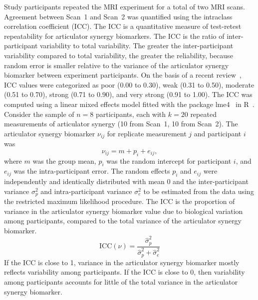 \documentclass[preprint]{JASAnew}\usepackage[]{graphicx}\usepackage[]{color}
\begin{document}
Study participants repeated the MRI experiment for a total of two MRI scans. Agreement between Scan~\num{1} and Scan~\num{2} was quantified using the intraclass correlation coefficient (ICC). The ICC is a quantitative measure of test-retest repeatability for articulator synergy biomarkers. 
The ICC is the ratio of inter-participant variability to total variability. The greater the inter-participant variability compared to total variability, the greater the reliability, because random error is smaller relative to the variance of the articulator synergy biomarker between experiment participants. 
On the basis of a recent review~\citep{lebreton2007answers}, ICC values were categorized as poor (\num{0.00} to \num{0.30}), weak (\num{0.31} to \num{0.50}), moderate (\num{0.51} to \num{0.70}), strong (\num{0.71} to \num{0.90}), and very strong (\num{0.91} to \num{1.00}).
%
The ICC was computed using a linear mixed effects model fitted with the package lme4~\citep{bates2015fitting} in R~\citep{r2017language}. Consider the sample of $n=8$ participants, each with $k=20$ repeated measurements of articulator synergy (\num{10} from Scan~\num{1}, \num{10} from Scan~\num{2}). The articulator synergy biomarker $\nu _{ij}$ for replicate measurement $j$ and participant $i$ was 
%
\begin{equation}
\nu _{ij} = m + p_i + e_{ij},
\end{equation}
%
where $m$ was the group mean, $p_i$ was the random intercept for participant $i$, and $e_{ij}$ was the intra-participant error. 
%
The random effects $p_i$ and $e_{ij}$ were independently and identically distributed with mean 0 and the inter-participant variance $\sigma_p^2$ and intra-participant variance $\sigma_e^2$ to be estimated from the data using the restricted maximum likelihood procedure. 
% 
The ICC is the proportion of variance in the articulator synergy biomarker value due to biological variation among participants, compared to the total variance of the articulator synergy biomarker.
%
\begin{equation}
\label{eq:icc}
\text{ICC}(\nu) = \frac{\hat{\sigma}_p^2}{\hat{\sigma}_p^2 + \hat{\sigma}_e^2}
\end{equation}
%
If the ICC is close to \num{1}, variance in the articulator synergy biomarker mostly reflects variability among participants. 
%
If the ICC is close to \num{0}, then variability among participants accounts for little of the total variance in the articulator synergy biomarker. 
\end{document}

